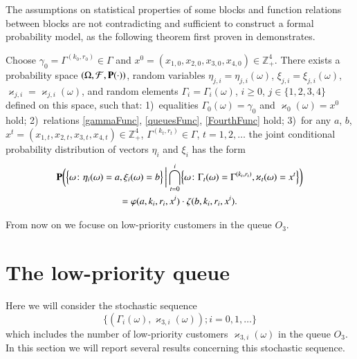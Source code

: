 \documentclass[10pt]{article}
\renewcommand{\Pr}{{\mathbf P}}
\begin{document}
The assumptions on statistical properties of some blocks and function relations between blocks are
not contradicting and sufficient to construct a formal probability model, as the following theorem
first proven in \cite{k:z:02:2015} demonstrates.
\begin{thm}\label{thm1}
  Choose $\gamma_0=\Gamma^{(k_0,r_0)}\in \Gamma$ and $x^0=(x_{1,0},x_{2,0}, x_{3,0},x_{4,0})\in
  \mathbb{Z}_+^4$.  There exists a probability space $(\Omega, {\cal F}, \Pr(\cdot))$, random
  variables $\eta_{j,i}=\eta_{j,i}(\omega)$, $\xi_{j,i}=\xi_{j,i}(\omega)$,
  $\varkappa_{j,i}=\varkappa_{j,i}(\omega)$, and random elements $\Gamma_i=\Gamma_i(\omega)$,
  $i\geqslant 0$, $j\in \{1, 2, 3, 4\}$  defined on this space, such that: 1)~equalities
  $\Gamma_0(\omega) = \gamma_0$ and $\varkappa_0(\omega)=x^0$ hold; 2)~relations
  \eqref{gammaFunc}, \eqref{queuesFunc}, \eqref{FourthFunc} hold; 3)~for any $a$, $b$,
  $x^t=(x_{1,t},x_{2,t},x_{3,t},x_{4,t}) \in \mathbb{Z}_+^4$, $\Gamma^{(k_t,r_t)} \in \Gamma$, $t =
  1, 2, \ldots$ the joint conditional probability distribution of vectors $\eta_i$ and $\xi_i$ has the form
  \begin{multline*}
    \Pr \biggl(\Bigl\{ \omega \colon \eta_i(\omega) = a, \xi_i(\omega)=b\Bigr\}\,
    \bigg|\bigcap_{t=0}^{i}\Bigl\{\omega\colon \Gamma_t(\omega)=\Gamma^{(k_t,r_t)},
    \varkappa_t(\omega)=x^t\Bigr\}\biggr)
    \\ =    \varphi(a,k_i,r_i,x^i) \cdot \zeta(b,k_i,r_i,x^i).
    \label{ProbablititiesToProve}
  \end{multline*}
\label{myTheorem}
\end{thm}

From now on we focuse on low-priority customers in the queue $O_3$. 

\section{The low-priority queue}

Here we will consider the stochastic sequence
\begin{equation}
\label{eq:theMC}
\{(\Gamma_i(\omega), \varkappa_{3, i}(\omega)); i =0, 1, \ldots\}
\end{equation}
which includes the number of low-priority customers $\varkappa_{3, i}(\omega)$ in the queue $O_3$.  In this
section we will report several results concerning this stochastic sequence.
\end{document}
